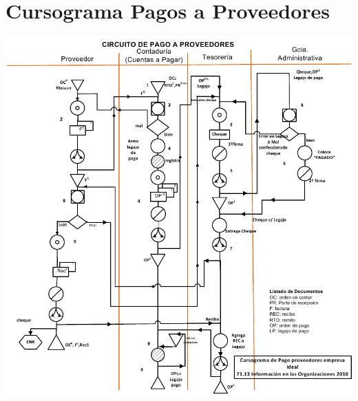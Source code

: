 \section{Cursograma Pagos a Proveedores}
\begin{center}
 \includegraphics[scale=0.7,keepaspectratio=true]{./Circuitos-Teoricos/Pago-a-Proveedores/Images/cursograma-pago-a-proveedores.png}
\end{center}

